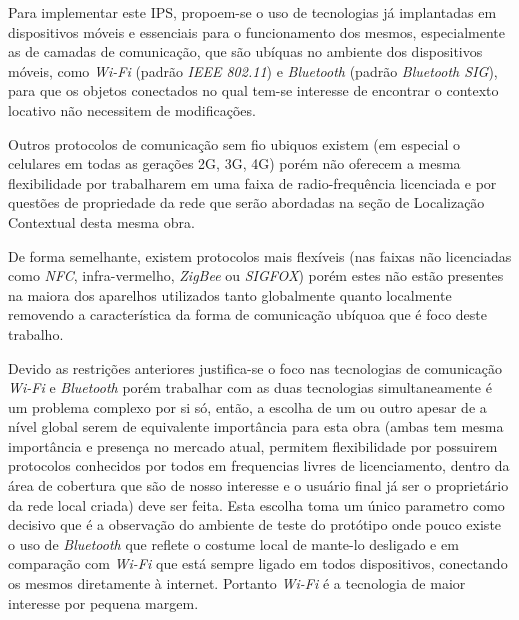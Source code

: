 Para implementar este IPS, propoem-se o uso de tecnologias já implantadas em
dispositivos móveis e essenciais para o funcionamento dos mesmos, especialmente
as de camadas de comunicação, que são ubíquas no ambiente dos dispositivos
móveis, como \emph{Wi-Fi} (padrão \emph{IEEE 802.11}) e \emph{Bluetooth}
(padrão \emph{Bluetooth SIG}), para que os objetos conectados no qual tem-se
interesse de encontrar o contexto locativo não necessitem de modificações.

Outros protocolos de comunicação sem fio ubiquos existem (em especial o
celulares em todas as gerações 2G, 3G, 4G) porém não oferecem a mesma
flexibilidade por trabalharem em uma faixa de radio-frequência licenciada e por
questões de propriedade da rede que serão abordadas na seção de Localização
Contextual desta mesma obra.

De forma semelhante, existem protocolos mais flexíveis (nas faixas não
licenciadas como \emph{NFC}, infra-vermelho, \emph{ZigBee} ou
\emph{SIGFOX}) porém estes não estão presentes na maiora dos aparelhos
utilizados tanto globalmente quanto localmente removendo a característica da
forma de comunicação ubíquoa que é foco deste trabalho.

Devido as restrições anteriores justifica-se o foco nas tecnologias de
comunicação \emph{Wi-Fi} e \emph{Bluetooth} porém trabalhar com as duas
tecnologias simultaneamente é um problema complexo por si só, então, a escolha
de um ou outro apesar de a nível global serem de equivalente importância para
esta obra (ambas tem mesma importância e presença no mercado atual, permitem
flexibilidade por possuirem protocolos conhecidos por todos em frequencias
livres de licenciamento, dentro da área de cobertura que são de nosso interesse
e o usuário final já ser o proprietário da rede local criada) deve ser feita.
Esta escolha toma um único parametro como decisivo que é a observação do
ambiente de teste do protótipo onde pouco existe o uso de \emph{Bluetooth} que
reflete o costume local de mante-lo desligado e em comparação com \emph{Wi-Fi}
que está sempre ligado em todos dispositivos, conectando os mesmos diretamente à
internet. Portanto \emph{Wi-Fi} é a tecnologia de maior interesse por pequena
margem.
